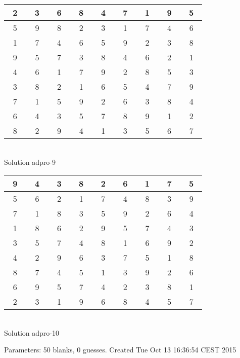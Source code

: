 \documentclass[12pt,a4paper]{article}
\begin{document}
\begin{center}
\begin{tabular}{||c|c|c||c|c|c||c|c|c||}\hline\hline
~2~&~3~&~6~&~8~&~4~&~7~&~1~&~9~&~5~\\\hline
~5~&~9~&~8~&~2~&~3~&~1~&~7~&~4~&~6~\\\hline
~1~&~7~&~4~&~6~&~5~&~9~&~2~&~3~&~8~\\\hline
\hline
~9~&~5~&~7~&~3~&~8~&~4~&~6~&~2~&~1~\\\hline
~4~&~6~&~1~&~7~&~9~&~2~&~8~&~5~&~3~\\\hline
~3~&~8~&~2~&~1~&~6~&~5~&~4~&~7~&~9~\\\hline
\hline
~7~&~1~&~5~&~9~&~2~&~6~&~3~&~8~&~4~\\\hline
~6~&~4~&~3~&~5~&~7~&~8~&~9~&~1~&~2~\\\hline
~8~&~2~&~9~&~4~&~1~&~3~&~5~&~6~&~7~\\\hline
\hline\end{tabular}\\[1.5ex]
Solution adpro-9
\end{center}
\begin{center}
\begin{tabular}{||c|c|c||c|c|c||c|c|c||}\hline\hline
~9~&~4~&~3~&~8~&~2~&~6~&~1~&~7~&~5~\\\hline
~5~&~6~&~2~&~1~&~7~&~4~&~8~&~3~&~9~\\\hline
~7~&~1~&~8~&~3~&~5~&~9~&~2~&~6~&~4~\\\hline
\hline
~1~&~8~&~6~&~2~&~9~&~5~&~7~&~4~&~3~\\\hline
~3~&~5~&~7~&~4~&~8~&~1~&~6~&~9~&~2~\\\hline
~4~&~2~&~9~&~6~&~3~&~7~&~5~&~1~&~8~\\\hline
\hline
~8~&~7~&~4~&~5~&~1~&~3~&~9~&~2~&~6~\\\hline
~6~&~9~&~5~&~7~&~4~&~2~&~3~&~8~&~1~\\\hline
~2~&~3~&~1~&~9~&~6~&~8~&~4~&~5~&~7~\\\hline
\hline\end{tabular}\\[1.5ex]
Solution adpro-10
\end{center}
\vfill
Parameters: 50 blanks, 0 guesses. Created Tue Oct 13 16:36:54 CEST 2015
\end{document}
